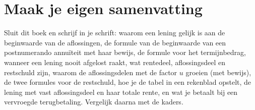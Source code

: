 \begin{oefeningen}







\end{oefeningen}


\ifzelfstudie
\section*{Maak je eigen samenvatting}
Sluit dit boek en schrijf in je schrift: waarom een lening gelijk is aan de beginwaarde van de aflossingen, de formule van de beginwaarde van een postnumerando annuïteit met haar bewijs, de formule voor het termijnbedrag, wanneer een lening nooit afgelost raakt, wat rentedeel, aflossingsdeel en restschuld zijn, waarom de aflossingsdelen met de factor $u$ groeien (met bewijs), de twee formules voor de restschuld, hoe je de tabel in een rekenblad opstelt, de lening met vast aflossingsdeel en haar totale rente, en wat je betaalt bij een vervroegde terugbetaling. Vergelijk daarna met de kaders.
\fi
